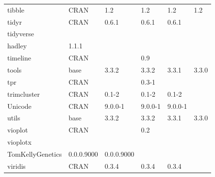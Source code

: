 \begin{longtable}{llllll}
\rowcolor{black!5}
tibble                        & \acrshort{CRAN}                      & 1.2         & 1.2         & 1.2            & 1.2                \\
\rowcolor{black!10}
tidyr                         & \acrshort{CRAN}                      & 0.6.1       & 0.6.1       & 0.6.1          &                   \\
\rowcolor{black!5}
tidyverse                     & \begin{tabular}[c]{@{}l@{}}GitHub \\ hadley \end{tabular}            & 1.1.1       &             &                &                    \\
\rowcolor{black!10}
timeline                      & \acrshort{CRAN}                      &             & 0.9         &                &                   \\
\rowcolor{black!5}
tools                         & base                      & 3.3.2       & 3.3.2       & 3.3.1          & 3.3.0              \\
\rowcolor{black!10}
tpr                           & \acrshort{CRAN}                      &             & 0.3-1       &                &                   \\
\rowcolor{black!5}
trimcluster                   & \acrshort{CRAN}                      & 0.1-2       & 0.1-2       & 0.1-2          &                    \\
\rowcolor{black!10}
Unicode                       & \acrshort{CRAN}                      & 9.0.0-1     & 9.0.0-1     & 9.0.0-1        &                   \\
\rowcolor{black!5}
utils                         & base                      & 3.3.2       & 3.3.2       & 3.3.1          & 3.3.0              \\
\rowcolor{black!10}
vioplot                       & \acrshort{CRAN}                      &             & 0.2         &                &                   \\
\rowcolor{black!5}
vioplotx                      & \begin{tabular}[c]{@{}l@{}}GitHub \\ TomKellyGenetics \end{tabular}  & 0.0.0.9000  & 0.0.0.9000  &                &                    \\
\rowcolor{black!10}
viridis                       & \acrshort{CRAN}                      & 0.3.4       & 0.3.4       & 0.3.4          &                   \\

\end{longtable}
